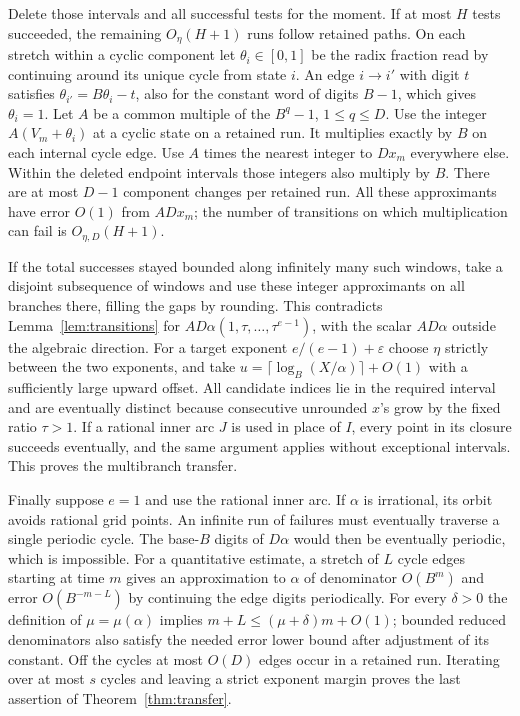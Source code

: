 \documentclass[11pt,reqno,a4paper]{amsart}
\theoremstyle{remark}
\begin{document}
Delete those intervals and all successful tests for the moment. If at
most \(H\) tests succeeded, the remaining \(O_\eta(H+1)\) runs follow
retained paths. On each stretch within a cyclic component let
\(\theta_i\in[0,1]\) be the radix fraction read by continuing around
its unique cycle from state \(i\). An edge \(i\to i'\) with digit
\(t\) satisfies \(\theta_{i'}=B\theta_i-t\), also for the constant
word of digits \(B-1\), which gives \(\theta_i=1\).
Let \(A\) be a common multiple of the \(B^q-1\), \(1\le q\le D\).
Use the integer \(A(V_m+\theta_i)\) at a cyclic state on a retained
run. It multiplies exactly by \(B\) on each internal cycle edge.
Use \(A\) times the nearest integer to \(D x_m\) everywhere else.
Within the deleted endpoint intervals those integers also multiply by
\(B\). There are at most \(D-1\) component changes per retained run.
All these approximants have error \(O(1)\) from \(ADx_m\);
the number of transitions on which multiplication can fail is
\(O_{\eta,D}(H+1)\).

If the total successes stayed bounded along infinitely many such
windows, take a disjoint subsequence of windows and use these integer
approximants on all branches there, filling the gaps by rounding.
This contradicts Lemma~\ref{lem:transitions} for
\(AD\alpha(1,\tau,\ldots,\tau^{e-1})\), with the scalar \(AD\alpha\)
outside the algebraic direction. For a target exponent
\(e/(e-1)+\varepsilon\) choose \(\eta\) strictly between the two
exponents, and take \(u=\lceil\log_B(X/\alpha)\rceil+O(1)\) with
a sufficiently large upward offset. All candidate indices lie in the
required interval and are eventually distinct because consecutive
unrounded \(x\)'s grow by the fixed ratio \(\tau>1\).
If a rational inner arc \(J\) is used in place of \(I\), every point
in its closure succeeds eventually, and the same argument applies
without exceptional intervals. This proves the multibranch transfer.

Finally suppose \(e=1\) and use the rational inner arc. If \(\alpha\)
is irrational, its orbit avoids rational grid points. An infinite
run of failures must eventually traverse a single periodic cycle.
The base-\(B\) digits of \(D\alpha\) would then be eventually periodic,
which is impossible. For a quantitative estimate, a stretch of \(L\)
cycle edges starting at time \(m\) gives an approximation to
\(\alpha\) of denominator \(O(B^m)\) and error \(O(B^{-m-L})\)
by continuing the edge digits periodically. For every \(\delta>0\)
the definition of \(\mu=\mu(\alpha)\) implies
\(m+L\le(\mu+\delta)m+O(1)\); bounded reduced denominators also
satisfy the needed error lower bound after adjustment of its constant.
Off the cycles at most \(O(D)\) edges occur in a retained run.
Iterating over at most \(s\) cycles and leaving a strict exponent
margin proves the last assertion of Theorem~\ref{thm:transfer}.
\end{document}
